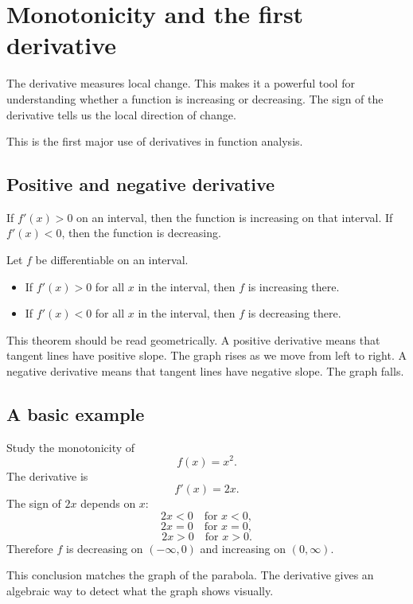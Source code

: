 \section{Monotonicity and the first derivative}

The derivative measures local change. This makes it a powerful tool for understanding whether a function is increasing or decreasing. The sign of the derivative tells us the local direction of change.

This is the first major use of derivatives in function analysis.

\subsection*{Positive and negative derivative}

If \(f'(x)>0\) on an interval, then the function is increasing on that interval. If \(f'(x)<0\), then the function is decreasing.

\begin{theorembox}
Let \(f\) be differentiable on an interval.
\begin{itemize}
\item If \(f'(x)>0\) for all \(x\) in the interval, then \(f\) is increasing there.
\item If \(f'(x)<0\) for all \(x\) in the interval, then \(f\) is decreasing there.
\end{itemize}
\end{theorembox}

This theorem should be read geometrically. A positive derivative means that tangent lines have positive slope. The graph rises as we move from left to right. A negative derivative means that tangent lines have negative slope. The graph falls.

\subsection*{A basic example}

\begin{examplebox}
Study the monotonicity of
\[
f(x)=x^2.
\]
The derivative is
\[
f'(x)=2x.
\]
The sign of \(2x\) depends on \(x\):
\[
2x<0 \quad\text{for } x<0,
\]
\[
2x=0 \quad\text{for } x=0,
\]
\[
2x>0 \quad\text{for } x>0.
\]
Therefore \(f\) is decreasing on \((-\infty,0)\) and increasing on \((0,\infty)\).
\end{examplebox}

This conclusion matches the graph of the parabola. The derivative gives an algebraic way to detect what the graph shows visually.

